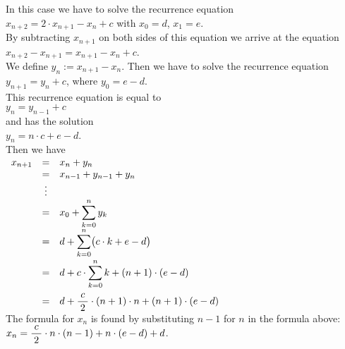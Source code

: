 \begin{enumerate}[(a)]
      In this case we have to solve the recurrence equation
      \\[0.2cm]
      \hspace*{1.3cm}
      $x_{n+2} = 2 \cdot x_{n+1} - x_n + c$ \quad with $x_0 = d$, $x_1=e$.
      \\[0.2cm]
      By subtracting $x_{n+1}$ on both sides of this equation we arrive at the equation
      \\[0.2cm]
      \hspace*{1.3cm}
      $x_{n+2} - x_{n+1} = x_{n+1} - x_n + c$.
      \\[0.2cm]
      We define $y_{n} := x_{n+1} - x_n$.  Then we have to solve the recurrence equation
      \\[0.2cm]
      \hspace*{1.3cm}
      $y_{n+1} = y_n + c$, \quad where $y_0 = e - d$.
      \\[0.2cm]
      This recurrence equation is equal to 
      \\[0.2cm]
      \hspace*{1.3cm}
      $y_n = y_{n-1} + c$
      \\[0.2cm]
      and has the solution 
      \\[0.2cm]
      \hspace*{1.3cm}
      $y_n = n \cdot c + e - d$.
      \\[0.2cm]
      Then we have
      \\[0.2cm]
      \hspace*{1.3cm}
      $
      \begin{array}{lcl}
        x_{n+1} & = & x_n + y_n \\
               & = & x_{n-1} + y_{n-1} + y_n \\
               & \vdots & \\
               & = & \displaystyle x_0 + \sum\limits_{k=0}^n y_k \\[0.2cm]
               & = & \displaystyle d + \sum\limits_{k=0}^n \bigl(c \cdot k + e - d\bigr) \\[0.4cm]
               & = & \displaystyle d + c \cdot\sum\limits_{k=0}^n  k + (n+1) \cdot (e - d) \\[0.5cm]
               & = & \displaystyle d + \frac{\;c\;}{2} \cdot (n+1) \cdot n + (n+1) \cdot (e - d) 
      \end{array}
      $
      \\[0.2cm]
      The formula for $x_n$ is found by substituting $n-1$ for $n$ in the formula above:
      \\[0.2cm]
      \hspace*{1.3cm}
      $x_n = \displaystyle \frac{\;c\;}{2} \cdot n \cdot (n-1) + n \cdot (e - d) + d$.
\end{enumerate}


